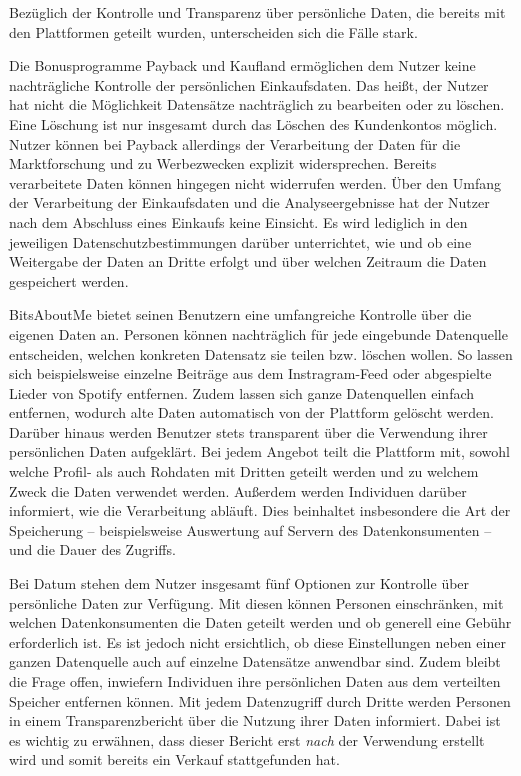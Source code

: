\noindent Bezüglich der Kontrolle und Transparenz über persönliche Daten, die bereits mit den Plattformen geteilt wurden, unterscheiden sich die Fälle stark. \newline

\noindent Die Bonusprogramme Payback und Kaufland ermöglichen dem Nutzer keine nachträgliche Kontrolle der persönlichen Einkaufsdaten. Das heißt, der Nutzer hat nicht die Möglichkeit Datensätze nachträglich zu bearbeiten oder zu löschen. Eine Löschung ist nur insgesamt durch das Löschen des Kundenkontos möglich. Nutzer können bei Payback allerdings der Verarbeitung der Daten für die Marktforschung und zu Werbezwecken explizit widersprechen. Bereits verarbeitete Daten können hingegen nicht widerrufen werden. Über den Umfang der Verarbeitung der Einkaufsdaten und die Analyseergebnisse hat der Nutzer nach dem Abschluss eines Einkaufs keine Einsicht. Es wird lediglich in den jeweiligen Datenschutzbestimmungen darüber unterrichtet, wie und ob eine Weitergabe der Daten an Dritte erfolgt und über welchen Zeitraum die Daten gespeichert werden. \newline

\noindent BitsAboutMe bietet seinen Benutzern eine umfangreiche Kontrolle über die eigenen Daten an. Personen können nachträglich für jede eingebunde Datenquelle entscheiden, welchen konkreten Datensatz sie teilen bzw. löschen wollen. So lassen sich beispielsweise einzelne Beiträge aus dem Instragram-Feed oder abgespielte Lieder von Spotify entfernen. Zudem lassen sich ganze Datenquellen einfach entfernen, wodurch alte Daten automatisch von der Plattform gelöscht werden. Darüber hinaus werden Benutzer stets transparent über die Verwendung ihrer persönlichen Daten aufgeklärt. Bei jedem Angebot teilt die Plattform mit, sowohl welche Profil- als auch Rohdaten mit Dritten geteilt werden und zu welchem Zweck die Daten verwendet werden. Außerdem werden Individuen darüber informiert, wie die Verarbeitung abläuft. Dies beinhaltet insbesondere die Art der Speicherung -- beispielsweise Auswertung auf Servern des Datenkonsumenten -- und die Dauer des Zugriffs. \newline

\noindent Bei Datum stehen dem Nutzer insgesamt fünf Optionen zur Kontrolle über persönliche Daten zur Verfügung. Mit diesen können Personen einschränken, mit welchen Datenkonsumenten die Daten geteilt werden und ob generell eine Gebühr erforderlich ist. Es ist jedoch nicht ersichtlich, ob diese Einstellungen neben einer ganzen Datenquelle auch auf einzelne Datensätze anwendbar sind. Zudem bleibt die Frage offen, inwiefern Individuen ihre persönlichen Daten aus dem verteilten Speicher entfernen können. Mit jedem Datenzugriff durch Dritte werden Personen in einem Transparenzbericht über die Nutzung ihrer Daten informiert. Dabei ist es wichtig zu erwähnen, dass dieser Bericht erst \textit{nach} der Verwendung erstellt wird und somit bereits ein Verkauf stattgefunden hat. \newline

